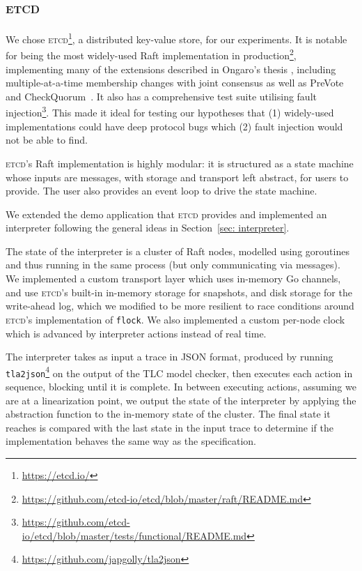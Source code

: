 \documentclass[a4paper]{article}
\newcommand{\tname}[1]{\textsc{#1}\xspace}
\newcommand{\etcd}{\tname{etcd}}
\begin{document}
\subsection{\etcd}

We chose \etcd\footnote{\url{https://etcd.io/}}, a distributed key-value store, for our experiments.
%
It is notable for being the most widely-used Raft implementation in production\footnote{\url{https://github.com/etcd-io/etcd/blob/master/raft/README.md}}, implementing many of the extensions described in Ongaro's thesis \cite{ongaro_consensus_2014}, including multiple-at-a-time membership changes with joint consensus as well as PreVote and CheckQuorum~\cite{howard_raft_2020}.
%
It also has a comprehensive test suite utilising fault injection\footnote{\url{https://github.com/etcd-io/etcd/blob/master/tests/functional/README.md}}.
%
This made it ideal for testing our hypotheses that (1) widely-used implementations could have deep protocol bugs which (2) fault injection would not be able to find.

\etcd's Raft implementation is highly modular: it is structured as a state machine whose inputs are messages, with storage and transport left abstract, for users to provide.
%
The user also provides an event loop to drive the state machine.

We extended the demo application that \etcd provides and implemented an interpreter following the general ideas in Section~\ref{sec: interpreter}.

The state of the interpreter is a cluster of Raft nodes, modelled using goroutines and thus running in the same process (but only communicating via messages).
%
We implemented a custom transport layer which uses in-memory Go channels, and use \etcd's built-in in-memory storage for snapshots, and disk storage for the write-ahead log, which we modified to be more resilient to race conditions around \etcd's implementation of \texttt{flock}.
%
We also implemented a custom per-node clock which is advanced by interpreter actions instead of real time.

The interpreter takes as input a trace in JSON format, produced by running \texttt{tla2json}\footnote{\url{https://github.com/japgolly/tla2json}} on the output of the TLC model checker, then executes each action in sequence, blocking until it is complete.
%
In between executing actions, assuming we are at a linearization point, we output the state of the interpreter by applying the abstraction function to the in-memory state of the cluster.
%
The final state it reaches is compared with the last state in the input trace to determine if the implementation behaves the same way as the specification.
\end{document}
